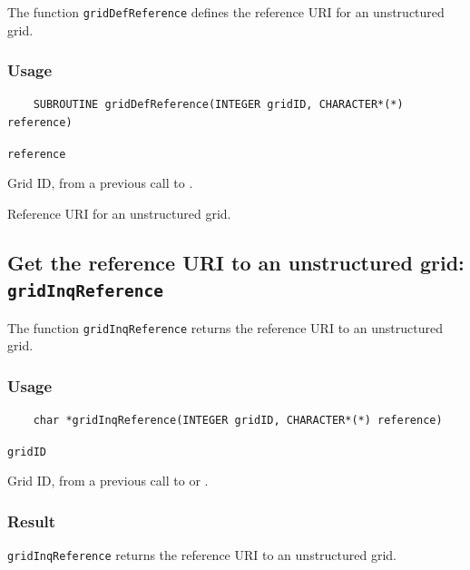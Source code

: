 The function {\texttt{gridDefReference}} defines the reference URI for an unstructured grid.

\subsubsection*{Usage}

\begin{verbatim}
    SUBROUTINE gridDefReference(INTEGER gridID, CHARACTER*(*) reference)
\end{verbatim}

\hspace*{4mm}\begin{minipage}[]{15cm}
\begin{deflist}{\texttt{reference}\ }
\item[\texttt{gridID}]
Grid ID, from a previous call to {}.
\item[\texttt{reference}]
Reference URI for an unstructured grid.

\end{deflist}
\end{minipage}


\subsection{Get the reference URI to an unstructured grid: \texttt{gridInqReference}}
\label{gridInqReference}

The function {\texttt{gridInqReference}} returns the reference URI to an unstructured grid.

\subsubsection*{Usage}

\begin{verbatim}
    char *gridInqReference(INTEGER gridID, CHARACTER*(*) reference)
\end{verbatim}

\hspace*{4mm}\begin{minipage}[]{15cm}
\begin{deflist}{\texttt{gridID}\ }
\item[\texttt{gridID}]
Grid ID, from a previous call to {} or {}.

\end{deflist}
\end{minipage}

\subsubsection*{Result}

{\texttt{gridInqReference}} returns the reference URI to an unstructured grid.

